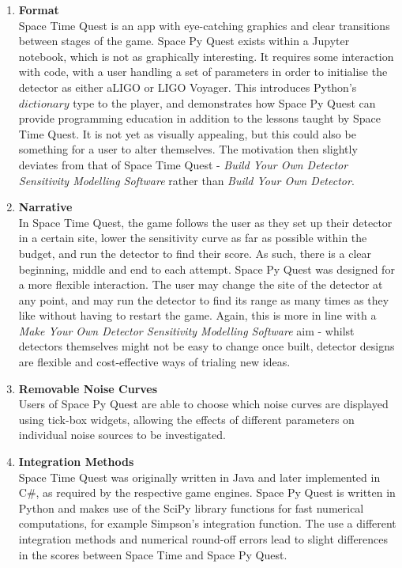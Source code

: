\documentclass{article}
\begin{document}
\begin{enumerate}
    \item \textbf{Format} \\
    Space Time Quest is an app with eye-catching graphics and clear
    transitions between stages of the game. Space Py Quest exists
    within a Jupyter notebook, which is not as graphically
    interesting. It requires some interaction with code, with a user
    handling a set of parameters in order to initialise the detector
    as either aLIGO or LIGO Voyager. This introduces Python's
    $dictionary$ type to the player, and demonstrates how Space Py
    Quest can provide programming education in addition to the lessons
    taught by Space Time Quest. It is not yet as visually appealing,
    but this could also be something for a user to alter
    themselves. The motivation then slightly deviates from that of
    Space Time Quest - \textit{Build Your Own Detector Sensitivity
      Modelling Software} rather than \textit{Build Your Own
      Detector}.
    \item \textbf{Narrative} \\
    In Space Time Quest, the game follows the user as they set up
    their detector in a certain site, lower the sensitivity curve as
    far as possible within the budget, and run the detector to find
    their score. As such, there is a clear beginning, middle and end
    to each attempt. Space Py Quest was designed for a more flexible
    interaction.  The user may change the site of the detector at any
    point, and may run the detector to find its range as many times as
    they like without having to restart the game. Again, this is more
    in line with a \textit{Make Your Own Detector Sensitivity
      Modelling Software} aim - whilst detectors themselves might not
    be easy to change once built, detector designs are flexible and
    cost-effective ways of trialing new ideas.
    \item \textbf{Removable Noise Curves} \\
    Users of Space Py Quest are able to choose which noise curves are
    displayed using tick-box widgets, allowing the effects of
    different parameters on individual noise sources to be
    investigated.
    \item \textbf{Integration Methods} \\
    Space Time Quest was originally written in Java and later
    implemented in
    C\#, as required by the respective game engines.  
    Space Py Quest is written in Python and makes use of the
    SciPy library functions for fast numerical computations, for 
    example Simpson's integration function. The use a different integration methods
    and numerical round-off errors lead to slight differences in the
    scores between Space Time and Space Py Quest.
\end{enumerate}
\end{document}
